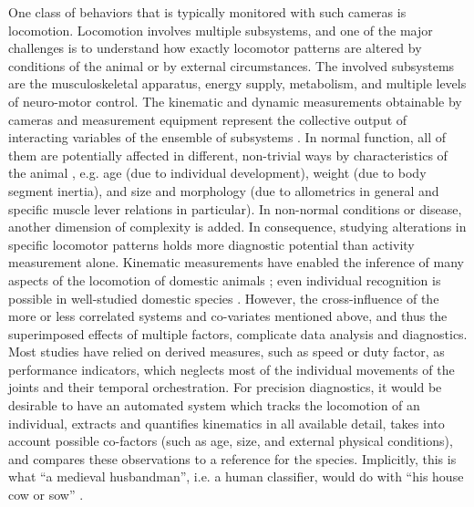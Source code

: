 One class of behaviors that is typically monitored with such cameras is locomotion.
Locomotion involves multiple subsystems, and one of the major challenges is to understand how exactly locomotor patterns are altered by conditions of the animal or by external circumstances.
The involved subsystems are the musculoskeletal apparatus, energy supply, metabolism, and multiple levels of neuro-motor control.
The kinematic and dynamic measurements obtainable by cameras and measurement equipment represent the collective output of interacting variables of the ensemble of subsystems \citep{Nishikawa2007}.
In normal function, all of them are potentially affected in different, non-trivial ways by characteristics of the animal \citep{Young2018}, e.g. age (due to individual development), weight (due to body segment inertia), and size and morphology (due to allometrics in general and specific muscle lever relations in particular).
In non-normal conditions or disease, another dimension of complexity is added.
In consequence, studying alterations in specific locomotor patterns holds more diagnostic potential than activity measurement alone.
Kinematic measurements have enabled the inference of many aspects of the locomotion of domestic animals \citep[e.g.][]{SchlageterTello2014,SerraBraganca2018,Qiao2021,Netukova2021}; even individual recognition is possible in well-studied domestic species \citep[e.g.][]{Figueiredo2018,Patua2021}.
However, the cross-influence of the more or less correlated systems and co-variates mentioned above, and thus the superimposed effects of multiple factors, complicate data analysis and diagnostics.
Most studies have relied on derived measures, such as speed or duty factor, as performance indicators, which neglects most of the individual movements of the joints and their temporal orchestration.
For precision diagnostics, it would be desirable to have an automated system which tracks the locomotion of an individual, extracts and quantifies kinematics in all available detail, takes into account possible co-factors (such as age, size, and external physical conditions), and compares these observations to a reference for the species.
Implicitly, this is what ``a medieval husbandman'', i.e. a human classifier, would do with ``his house cow or sow'' \citep{Wathes2008}.


